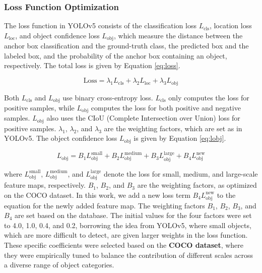 \documentclass[preprint,review,12pt]{elsarticle}
\begin{document}
\subsubsection{Loss Function Optimization}

The loss function in YOLOv5 consists of the classification loss \( L_{\text{cls}} \), location loss \( L_{\text{loc}} \), and object confidence loss \( L_{\text{obj}} \), which measure the distance between the anchor box classification and the ground-truth class, the predicted box and the labeled box, and the probability of the anchor box containing an object, respectively. The total loss is given by Equation \eqref{eq:loss}.

\begin{equation}
\text{Loss} = \lambda_1 L_{\text{cls}} + \lambda_2 L_{\text{loc}} + \lambda_3 L_{\text{obj}}
\label{eq:loss}
\end{equation}

Both \( L_{\text{cls}} \) and \( L_{\text{obj}} \) use binary cross-entropy loss. \( L_{\text{cls}} \) only computes the loss for positive samples, while \( L_{\text{obj}} \) computes the loss for both positive and negative samples. \( L_{\text{obj}} \) also uses the CIoU (Complete Intersection over Union) loss for positive samples. \( \lambda_1 \), \( \lambda_2 \), and \( \lambda_3 \) are the weighting factors, which are set as in YOLOv5. 
The object confidence loss \( L_{\text{obj}} \) is given by Equation \eqref{eq:lobj}.

\begin{equation}
L_{\text{obj}} = B_1 L_{\text{obj}}^{\text{small}} + B_2 L_{\text{obj}}^{\text{medium}} + B_3 L_{\text{obj}}^{\text{large}} + B_4 L_{\text{obj}}^{\text{new}}
\label{eq:lobj}   
\end{equation}

where \( L_{\text{obj}}^{\text{small}} \), \( L_{\text{obj}}^{\text{medium}} \), and \( L_{\text{obj}}^{\text{large}} \) denote the loss for small, medium, and large-scale feature maps, respectively. \( B_1 \), \( B_2 \), and \( B_3 \) are the weighting factors, as optimized on the COCO\cite{Lin2014} dataset. In this work, we add a new loss term \( B_4 L_{\text{obj}}^{\text{new}} \) to the equation for the newly added feature map. The weighting factors \( B_1 \), \( B_2 \), \( B_3 \), and \( B_4 \) are set based on the database. The initial values for the four factors were set to 4.0, 1.0, 0.4, and 0.2, borrowing the idea from YOLOv5, where small objects, which are more difficult to detect, are given larger weights in the loss function. These specific coefficients were selected based on the \textbf{COCO dataset}, where they were empirically tuned to balance the contribution of different scales across a diverse range of object categories.
\end{document}
